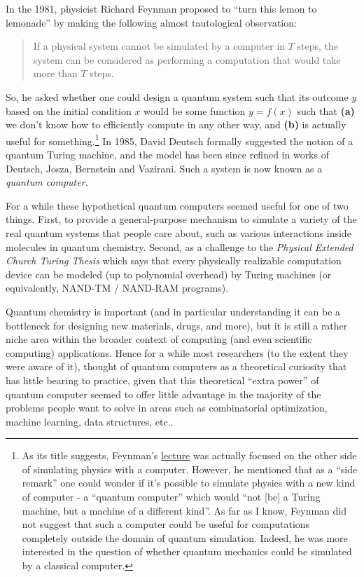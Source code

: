 In the 1981, physicist Richard Feynman proposed to ``turn this lemon to
lemonade'' by making the following almost tautological observation:

\begin{quote}
If a physical system cannot be simulated by a computer in \(T\) steps,
the system can be considered as performing a computation that would take
more than \(T\) steps.
\end{quote}

So, he asked whether one could design a quantum system such that its
outcome \(y\) based on the initial condition \(x\) would be some
function \(y=f(x)\) such that \textbf{(a)} we don't know how to
efficiently compute in any other way, and \textbf{(b)} is actually
useful for something.\footnote{As its title suggests, Feynman's
  \href{https://www.cs.berkeley.edu/~christos/classics/Feynman.pdf}{lecture}
  was actually focused on the other side of simulating physics with a
  computer. However, he mentioned that as a ``side remark'' one could
  wonder if it's possible to simulate physics with a new kind of
  computer - a ``quantum computer'' which would ``not {[}be{]} a Turing
  machine, but a machine of a different kind''. As far as I know,
  Feynman did not suggest that such a computer could be useful for
  computations completely outside the domain of quantum simulation.
  Indeed, he was more interested in the question of whether quantum
  mechanics could be simulated by a classical computer.} In 1985, David
Deutsch formally suggested the notion of a quantum Turing machine, and
the model has been since refined in works of Deutsch, Josza, Bernstein
and Vazirani. Such a system is now known as a \emph{quantum computer}.

For a while these hypothetical quantum computers seemed useful for one
of two things. First, to provide a general-purpose mechanism to simulate
a variety of the real quantum systems that people care about, such as
various interactions inside molecules in quantum chemistry. Second, as a
challenge to the \emph{Physical Extended Church Turing Thesis} which
says that every physically realizable computation device can be modeled
(up to polynomial overhead) by Turing machines (or equivalently, NAND-TM
/ NAND-RAM programs).

Quantum chemistry is important (and in particular understanding it can
be a bottleneck for designing new materials, drugs, and more), but it is
still a rather niche area within the broader context of computing (and
even scientific computing) applications. Hence for a while most
researchers (to the extent they were aware of it), thought of quantum
computers as a theoretical curiosity that has little bearing to
practice, given that this theoretical ``extra power'' of quantum
computer seemed to offer little advantage in the majority of the
problems people want to solve in areas such as combinatorial
optimization, machine learning, data structures, etc..


